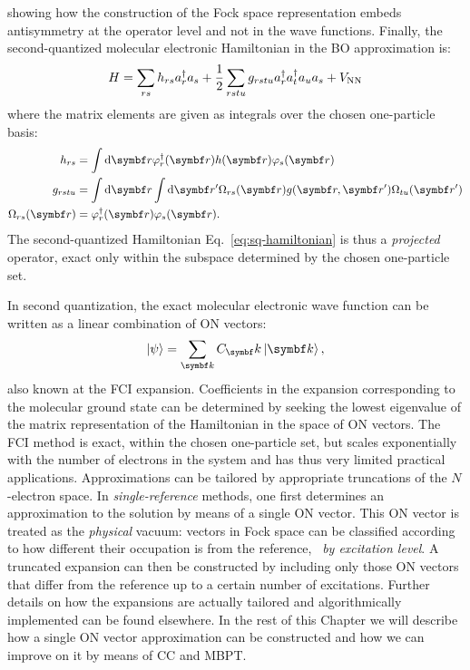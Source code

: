 showing how the construction of the Fock space representation
embeds antisymmetry at the operator level and not in the wave functions.
Finally, the second-quantized molecular electronic Hamiltonian in the \acrlong{BO}
approximation is:\autocite{Helgaker2000-tz, Shavitt2009-mr}
\begin{equation}\label{eq:sq-hamiltonian}
  H = \sum_{rs}h_{rs}a_{r}^{\dagger}a_{s}
  + \frac{1}{2}\sum_{rstu}g_{rstu}a_{r}^{\dagger}a_{t}^{\dagger}a_{u}a_{s}
  + V_\mathrm{NN}
\end{equation}
where the matrix elements are given as integrals over the chosen
one-particle basis:
\begin{subequations}
 \begin{align}
   h_{rs} &= \int \diff\vect{r} \varphi_r^\dagger(\vect{r}) h(\vect{r})\varphi_s(\vect{r}) \label{eq:one-el}\\
   g_{rstu} &=
   \int\diff\vect{r}\int\diff\vect{r}^\prime
   \Omega_{rs}(\vect{r}) g(\vect{r},\vect{r}^\prime) \Omega_{tu}(\vect{r}^\prime) \label{eq:two-el} \\
  \Omega_{rs}(\vect{r}) &= \varphi_r^\dagger(\vect{r})\varphi_s(\vect{r}). \label{eq:overlap}
 \end{align}
\end{subequations}
The second-quantized Hamiltonian Eq.~\eqref{eq:sq-hamiltonian} is thus a
\emph{projected} operator, exact only within the subspace determined by
the chosen one-particle set.~\autocite{Gross1991-hi, Helgaker2000-tz}

In second quantization, the exact molecular electronic wave function can
be written as a linear combination of \acrshort{ON} vectors:
\begin{equation}
  \ket{\psi} = \sum_{\vect{k}}C_\vect{k}\ket{\vect{k}},
\end{equation}
also known at the \gls{FCI} expansion.
Coefficients in the expansion corresponding to the molecular ground
state can be determined by seeking the lowest eigenvalue of the matrix
representation of the Hamiltonian in the space of \acrshort{ON} vectors.
The \acrshort{FCI} method is exact, within the chosen one-particle set,
but scales exponentially with the number of electrons in the system and
has thus very limited practical applications.
Approximations can be tailored by appropriate truncations of the
$N$-electron space.
In \emph{single-reference} methods, one first determines an
approximation to the solution by means of a single \acrshort{ON} vector.
This \acrshort{ON} vector is treated as the \emph{physical} vacuum:
vectors in Fock space can be classified according to how different their
occupation is from the reference, \ie~\emph{by excitation
level}.\autocite{Helgaker2000-tz, Shavitt2009-mr}
A truncated expansion can then be constructed by including only those
\acrshort{ON} vectors that differ from the reference up to a certain
number of excitations.
Further details on how the expansions are actually tailored and
algorithmically implemented can be found elsewhere.\autocite{Helgaker2000-tz}
In the rest of this Chapter we will describe how a single \acrshort{ON}
vector approximation can be constructed and how we can improve on it by
means of \acrlong{CC} and \acrlong{MBPT}.

